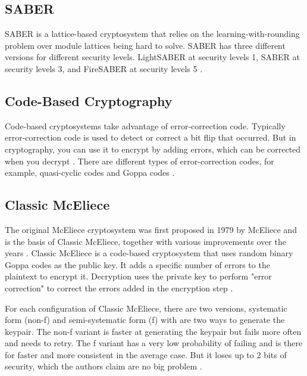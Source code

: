 
\subsection{SABER}
SABER is a lattice-based cryptosystem that relies on the learning-with-rounding problem over module lattices being hard to solve. SABER has three different versions for different security levels. LightSABER at security levels 1, SABER at security levels 3, and FireSABER at security levels 5 \cite{saber}.


\subsection{Code-Based Cryptography}
Code-based cryptosystems take advantage of error-correction code. Typically error-correction code is used to detect or correct a bit flip that occurred. But in cryptography, you can use it to encrypt by adding errors, which can be corrected when you decrypt \cite{bernstein2017}. There are different types of error-correction codes, for example, quasi-cyclic codes and Goppa codes  \cite{sendrier2011}.

\subsection{Classic McEliece}
\label{section:background:mceliece}
The original McEliece cryptosystem was first proposed in 1979 by McEliece \cite{mceliece1978} and is the basis of Classic McEliece, together with various improvements over the years  \cite{mceliece2020}. Classic McEliece is a code-based cryptosystem that uses random binary Goppa codes as the public key. It adds a specific number of errors to the plaintext to encrypt it. Decryption uses the private key to perform "error correction" to correct the errors added in the encryption step \cite{mceliece2020}.
 
For each configuration of Classic McEliece, there are two versions, systematic form (non-f) and semi-systematic form (f) with are two ways to generate the keypair. The non-f variant is faster at generating the keypair but fails more often and needs to retry. The f variant has a very low probability of failing and is there for faster and more consistent in the average case. But it loses up to 2 bits of security, which the authors claim are no big problem \cite{mceliece2020}.

